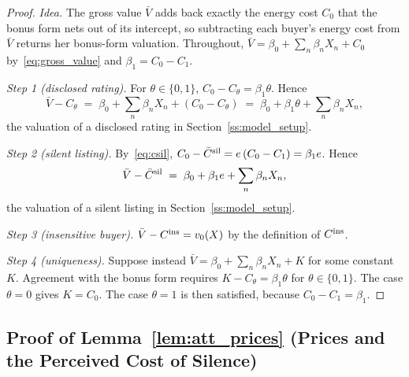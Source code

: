 \begin{proof}\upshape
\emph{Idea.} The gross value $\bar V$ adds back exactly the energy cost $C_0$ that the bonus form nets out of its intercept, so subtracting each buyer's energy cost from $\bar V$ returns her bonus-form valuation. Throughout, $\bar V=\beta_0+\sum_n\beta_nX_n+C_0$ by~\eqref{eq:gross_value} and $\beta_1=C_0-C_1$.

\emph{Step 1 (disclosed rating).} For $\theta\in\{0,1\}$, $C_0-C_\theta=\beta_1\theta$. Hence
\begin{equation*}
    \bar V-C_\theta\;=\;\beta_0+\sum_n\beta_nX_n+(C_0-C_\theta)\;=\;\beta_0+\beta_1\theta+\sum_n\beta_nX_n,
\end{equation*}
the valuation of a disclosed rating in Section~\ref{ss:model_setup}.

\emph{Step 2 (silent listing).} By~\eqref{eq:csil}, $C_0-\bar C^{\rm sil}=e\,(C_0-C_1)=\beta_1e$. Hence
\begin{equation*}
    \bar V-\bar C^{\rm sil}\;=\;\beta_0+\beta_1e+\sum_n\beta_nX_n,
\end{equation*}
the valuation of a silent listing in Section~\ref{ss:model_setup}.

\emph{Step 3 (insensitive buyer).} $\bar V-C^{\rm ins}=v_0(X)$ by the definition of $C^{\rm ins}$.

\emph{Step 4 (uniqueness).} Suppose instead $\bar V=\beta_0+\sum_n\beta_nX_n+K$ for some constant $K$. Agreement with the bonus form requires $K-C_\theta=\beta_1\theta$ for $\theta\in\{0,1\}$. The case $\theta=0$ gives $K=C_0$. The case $\theta=1$ is then satisfied, because $C_0-C_1=\beta_1$.
\end{proof}

\subsection*{Proof of Lemma~\ref{lem:att_prices} (Prices and the Perceived Cost of Silence)}

